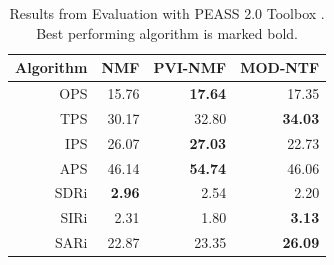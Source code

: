 \begin{table}
\begin{center}
\small
\begin{tabular}{ r | r r r }
  Algorithm & NMF & PVI-NMF & MOD-NTF \\
  \hline
  OPS & 15.76 & \textbf{17.64} & 17.35 \\
  TPS & 30.17 & 32.80 & \textbf{34.03} \\
  IPS & 26.07 & \textbf{27.03} & 22.73 \\
  APS & 46.14 & \textbf{54.74} & 46.06 \\
  \hline
  SDRi & \textbf{2.96} & 2.54 & 2.20 \\
  SIRi & 2.31 & 1.80 & \textbf{3.13} \\
  SARi & 22.87 & 23.35 & \textbf{26.09} \\
\end{tabular}
\end{center}
  \caption{Results from Evaluation with PEASS 2.0 Toolbox \cite{emiya11}. Best performing algorithm is marked bold.}
  \label{tab:results}
\end{table}

